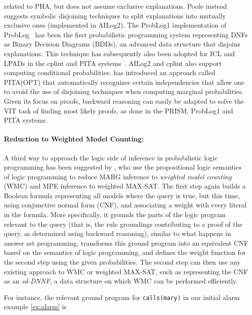 \documentclass[a4paper]{article}
\begin{document}
related to PHA, but does not assume exclusive explanations. Poole
instead suggests symbolic disjoining techniques to split explanations into
mutually exclusive ones (implemented in AILog2). The ProbLog1
implementation of ProbLog~\citep{DeRaedt07-IJCAIa,Kimmig11} has
been the first probabilistic programming system representing DNFs as Binary Decision
Diagrams (BDDs), an advanced
data structure that disjoins explanations. This technique has
subsequently also been adopted for ICL and
LPADs in the cplint and PITA
systems~\citep{Riguzzi09,Riguzzi11}. AILog2 and cplint also support
computing conditional probabilities. \cite{riguzzi:tcj13} has introduced
an approach called PITA(OPT) that automatically recognizes certain independencies that
allow one to avoid the use of disjoining techniques when computing marginal probabilities. Given its focus on proofs, backward
reasoning can easily be adapted to solve the VIT task of finding most
likely proofs, as done in the PRISM, ProbLog1 and PITA systems.  



\paragraph{Reduction to Weighted Model Counting:} A third way to approach the logic side of inference in probabilistic
logic programming has been suggested by \cite{Fierens11,Fierens13}, who use   
the propositional logic semantics of logic
programming  to reduce MARG inference to 
\emph{weighted model counting} (WMC) and MPE inference to weighted MAX-SAT. The first step again builds a
Boolean formula representing all models where the query
is true, but this time, using conjunctive normal form (CNF), and
associating a weight with every literal in the formula. More specifically, it grounds the parts of
the logic program relevant to the query (that is, the rule groundings
contributing to a proof of the query, as determined using backward
reasoning), similar to what happens in
answer set programming, transforms this ground
program into an equivalent CNF based on the semantics of logic
programming, and defines the weight function for the second step using
the given probabilities.  The
second step can then use any existing approach to
WMC or weighted MAX-SAT, such as representing 
 the CNF as an  \emph{sd-DNNF}, a data structure on which WMC can be performed
efficiently. 

For instance, the relevant ground program for \verb|calls(mary)| in
our initial alarm example \eqref{ex:alarm} is 
\end{document}
